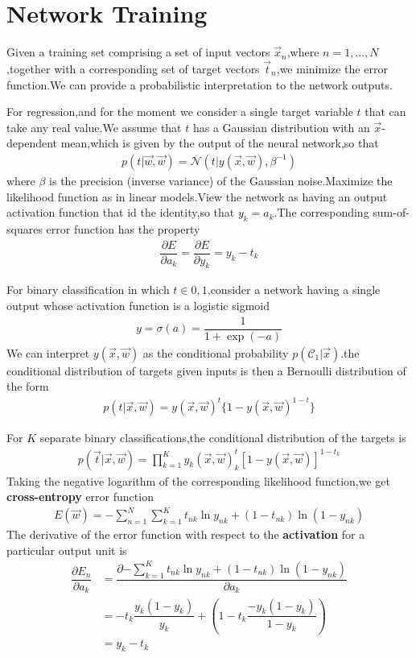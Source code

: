 \section{Network Training}
Given a training set comprising a set of input vectors ${\vec{x}_n}$,where $n=1,\ldots,N$,together with a corresponding set of target vectors ${\vec{t}_n}$,we minimize the error function.We can provide a probabilistic interpretation to the network outputs.

For regression,and for the moment we consider a single target variable $t$ that can take any real value.We assume that $t$ has a Gaussian distribution with an $\vec{x}$-dependent mean,which is given by the output of the neural network,so that
\begin{align}
    p(t|\vec{w},\vec{w})=\mathcal{N}(t|y(\vec{x},\vec{w}),\beta^{-1})
\end{align}
where $\beta$ is the precision (inverse variance) of the Gaussian noise.Maximize the likelihood function as in linear models.View the network as having an output activation function that id the identity,so that $y_k=a_k$.The corresponding sum-of-squares error function has the property
\begin{align}\label{eqn:output activation function derivative}
    \dfrac{\partial E}{\partial a_k}=\dfrac{\partial E}{\partial y_k}=y_k - t_k
\end{align}

For binary classification in which $t\in{0,1}$,consider a network having a single output whose activation function is a logistic sigmoid
\begin{align}
    y=\sigma(a)=\dfrac{1}{1+\exp(-a)}
\end{align}
We can interpret $y(\vec{x},\vec{w})$ as the conditional probability $p(\mathcal{C}_1|\vec{x})$.the conditional distribution of targets given inputs is then a Bernoulli distribution of the form
\begin{align}
    p(t|\vec{x},\vec{w})=y(\vec{x},\vec{w})^t\{{1-y(\vec{x},\vec{w})}^{1-t}\}
\end{align}

For $K$ separate binary classifications,the conditional distribution of the targets is
\begin{align}
    p(\vec{t}|\vec{x},\vec{w})=\prod_{k=1}^{K}y_k(\vec{x},\vec{w})^t_k[1-y(\vec{x},\vec{w})]^{1-t_k}
\end{align}
Taking the negative logarithm of the corresponding likelihood function,we get \textbf{cross-entropy} error function
\begin{align}
    E(\vec{w})=-\sum_{n=1}^{N}\sum_{k=1}^{K}{t_{nk}\ln y_{nk}+(1-t_{nk})\ln(1-y_{nk})}
\end{align}
The derivative of the error function with respect to the \textbf{activation} for a particular output unit is
\begin{align}
    \dfrac{\partial E_n}{\partial a_k}
    &=\dfrac{\partial {-\sum_{k=1}^{K}{t_{nk}\ln y_{nk}+(1-t_{nk})\ln(1-y_{nk})} }}{\partial a_k} \\
    &=-{t_{k} \dfrac{y_{k}(1-y_{k})}{y_{k}} +(1-t_{k}\dfrac{-y_{k}(1-y_{k})}{1-y_{k}}) } \\
    &={y_{k}-t_{k}}
\end{align}

